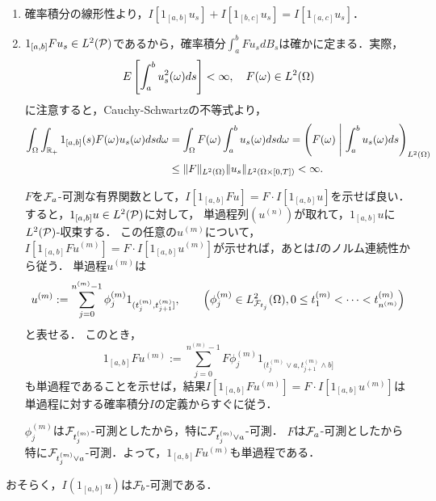 \documentclass[uplatex,dvipdfmx]{jsreport}
\begin{document}
\begin{Proof}\mbox{}
    \begin{enumerate}
        \item 確率積分の線形性より，$I[1_{[a,b]}u_s]+I[1_{[b,c]}u_s]=I[1_{[a,c]}u_s]$．
        \item $1_{[a,b]}Fu_s\in L^2(\P)$であるから，確率積分$\int^b_aFu_sdB_s$は確かに定まる．実際，
        \[E\Square{\int^b_au_s^2(\om)ds}<\infty,\quad F(\om)\in L^2(\Om)\]
        に注意すると，Cauchy-Schwartzの不等式より，
        \begin{align*}
            \int_\Om\int_{\R_+}1_{[a,b]}(s)F(\om)u_s(\om)dsd\om&=\int_\Om F(\om)\int^b_au_s(\om)dsd\om=\paren{F(\om)\;\middle|\;\int^b_au_s(\om)ds}_{L^2(\Om)}\\
            &\le\norm{F}_{L^2(\Om)}\norm{u_s}_{L^2(\Om\times[0,T])}<\infty.
        \end{align*}

        $F$を$\F_a$-可測な有界関数として，$I[1_{[a,b]}Fu]=F\cdot I[1_{[a,b]}u]$を示せば良い．
        すると，$1_{[a,b]}u\in L^2(\P)$に対して，
        単過程列$(u^{(n)})$が取れて，$1_{[a,b]}u$に$L^2(\P)$-収束する．
        この任意の$u^{(m)}$について，$I[1_{[a,b]}Fu^{(m)}]=F\cdot I[1_{[a,b]}u^{(m)}]$が示せれば，あとは$I$のノルム連続性から従う．
        単過程$u^{(m)}$は
        \[u^{(m)}:=\sum^{n^{(m)}-1}_{j=0}\phi^{(m)}_{j}1_{(t_j^{(m)},t_{j+1}^{(m)}]},\qquad\paren{\phi^{(m)}_j\in L^2_{\F_{t_j}}(\Om),0\le t_1^{(m)}<\cdots<t_{n^{(m)}}^{(m)}}\]
        と表せる．
        このとき，
        \[1_{[a,b]}Fu^{(m)}:=\sum^{n^{(m)}-1}_{j=0}F\phi^{(m)}_{j}1_{(t_j^{(m)}\lor a,t_{j+1}^{(m)}\land b]}\]
        も単過程であることを示せば，結果$I[1_{[a,b]}Fu^{(m)}]=F\cdot I[1_{[a,b]}u^{(m)}]$は単過程に対する確率積分$I$の定義からすぐに従う．
        
        $\phi_j^{(m)}$は$\F_{t_j^{(m)}}$-可測としたから，特に$\F_{t_j^{(m)}\lor a}$-可測．
        $F$は$\F_a$-可測としたから特に$\F_{t_j^{(m)}\lor a}$-可測．よって，$1_{[a,b]}Fu^{(m)}$も単過程である．
    \end{enumerate}
\end{Proof}
\begin{remarks}
    おそらく，$I(1_{[a,b]}u)$は$\F_b$-可測である．
\end{remarks}
\end{document}
